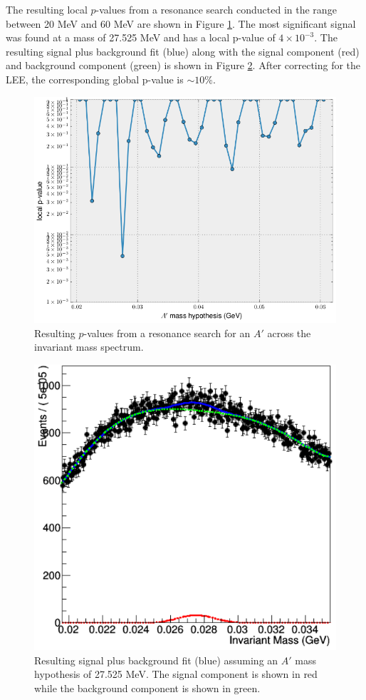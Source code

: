 The resulting local $p$-values from a resonance search conducted in the range 
between 20 MeV and 60 MeV are shown in Figure \ref{fig:local_p_values}. 
The most significant signal
was found at a mass of 27.525 MeV and has a local p-value of $4 \times 10^{-3}$.
The resulting signal plus background fit (blue) along with the signal component 
(red) and background component (green) is shown in Figure \ref{fig:fit_27}.
After correcting for the LEE, the corresponding global p-value is 
$\sim 10\%$.
\begin{figure}[t]
    \centering
    \includegraphics[width=\textwidth]{images/final_p_values.png}
    \caption{Resulting $p$-values from a resonance search for an $A'$ across the
    invariant mass spectrum.}
    \label{fig:local_p_values}
\end{figure}

\begin{figure}[ht]
    \centering
    \includegraphics[width=.6\textwidth]{images/fit27.png}
    \caption{Resulting signal plus background fit (blue) assuming an $A'$ mass hypothesis
             of 27.525 MeV.  The signal component is shown in red while the 
         background component is shown in green.}
    \label{fig:fit_27}
\end{figure}

